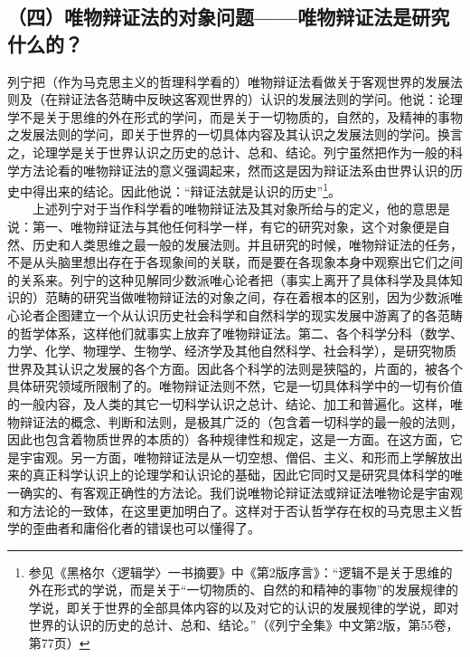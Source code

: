 \documentclass[cn,11pt,chinese]{elegantbook}
\def\myformat#1{\hfil\hfil #1}
\begin{document}
\subsection*{\myformat{（四）唯物辩证法的对象问题——唯物辩证法是研究什么的？}}
列宁把（作为马克思主义的哲理科学看的）唯物辩证法看做关于客观世界的发展法则及（在辩证法各范畴中反映这客观世界的）认识的发展法则的学问。他说：论理学不是关于思维的外在形式的学问，而是关于一切物质的，自然的，及精神的事物之发展法则的学问，即关于世界的一切具体内容及其认识之发展法则的学问。换言之，论理学是关于世界认识之历史的总计、总和、结论。列宁虽然把作为一般的科学方法论看的唯物辩证法的意义强调起来，然而这是因为辩证法系由世界认识的历史中得出来的结论。因此他说：“辩证法就是认识的历史”\footnote[1]{ 参见《黑格尔〈逻辑学〉一书摘要》中《第2版序言》：“逻辑不是关于思维的外在形式的学说，而是关于“一切物质的、自然的和精神的事物”的发展规律的学说，即关于世界的全部具体内容的以及对它的认识的发展规律的学说，即对世界的认识的历史的总计、总和、结论。”（《列宁全集》中文第2版，第55卷，第77页）}。\\
　　上述列宁对于当作科学看的唯物辩证法及其对象所给与的定义，他的意思是说：第一、唯物辩证法与其他任何科学一样，有它的研究对象，这个对象便是自然、历史和人类思维之最一般的发展法则。并且研究的时候，唯物辩证法的任务，不是从头脑里想出存在于各现象间的关联，而是要在各现象本身中观察出它们之间的关系来。列宁的这种见解同少数派唯心论者把（事实上离开了具体科学及具体知识的）范畴的研究当做唯物辩证法的对象之间，存在着根本的区别，因为少数派唯心论者企图建立一个从认识历史社会科学和自然科学的现实发展中游离了的各范畴的哲学体系，这样他们就事实上放弃了唯物辩证法。第二、各个科学分科（数学、力学、化学、物理学、生物学、经济学及其他自然科学、社会科学），是研究物质世界及其认识之发展的各个方面。因此各个科学的法则是狭隘的，片面的，被各个具体研究领域所限制了的。唯物辩证法则不然，它是一切具体科学中的一切有价值的一般内容，及人类的其它一切科学认识之总计、结论、加工和普遍化。这样，唯物辩证法的概念、判断和法则，是极其广泛的（包含着一切科学的最一般的法则，因此也包含着物质世界的本质的）各种规律性和规定，这是一方面。在这方面，它是宇宙观。另一方面，唯物辩证法是从一切空想、僧侣、主义、和形而上学解放出来的真正科学认识上的论理学和认识论的基础，因此它同时又是研究具体科学的唯一确实的、有客观正确性的方法论。我们说唯物论辩证法或辩证法唯物论是宇宙观和方法论的一致体，在这里更加明白了。这样对于否认哲学存在权的马克思主义哲学的歪曲者和庸俗化者的错误也可以懂得了。\\
\end{document}
